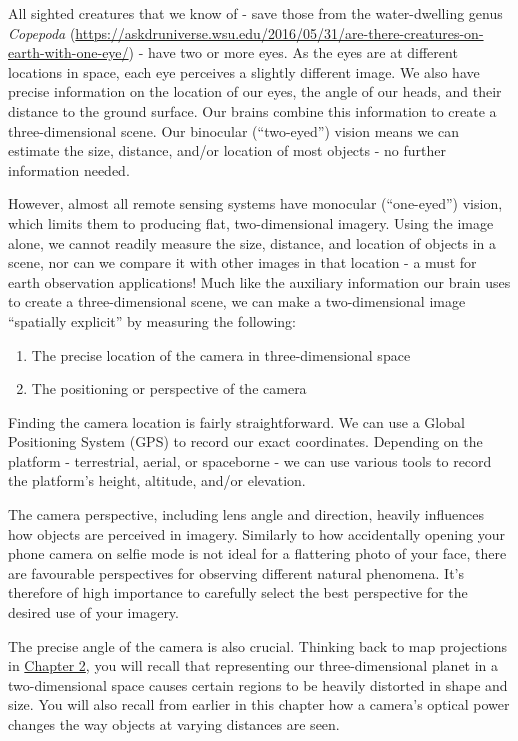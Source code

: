 \documentclass[
]{book}
\providecommand{\tightlist}{%
  \setlength{\itemsep}{0pt}\setlength{\parskip}{0pt}}
\begin{document}
All sighted creatures that we know of - save those from the water-dwelling genus \emph{Copepoda} (\url{https://askdruniverse.wsu.edu/2016/05/31/are-there-creatures-on-earth-with-one-eye/}) - have two or more eyes. As the eyes are at different locations in space, each eye perceives a slightly different image. We also have precise information on the location of our eyes, the angle of our heads, and their distance to the ground surface. Our brains combine this information to create a three-dimensional scene. Our binocular (``two-eyed'') vision means we can estimate the size, distance, and/or location of most objects - no further information needed.

However, almost all remote sensing systems have monocular (``one-eyed'') vision, which limits them to producing flat, two-dimensional imagery. Using the image alone, we cannot readily measure the size, distance, and location of objects in a scene, nor can we compare it with other images in that location - a must for earth observation applications! Much like the auxiliary information our brain uses to create a three-dimensional scene, we can make a two-dimensional image ``spatially explicit'' by measuring the following:

\begin{enumerate}
\def\labelenumi{\arabic{enumi}.}
\tightlist
\item
  The precise location of the camera in three-dimensional space
\item
  The positioning or perspective of the camera
\end{enumerate}

Finding the camera location is fairly straightforward. We can use a Global Positioning System (GPS) to record our exact coordinates. Depending on the platform - terrestrial, aerial, or spaceborne - we can use various tools to record the platform's height, altitude, and/or elevation.

The camera perspective, including lens angle and direction, heavily influences how objects are perceived in imagery. Similarly to how accidentally opening your phone camera on selfie mode is not ideal for a flattering photo of your face, there are favourable perspectives for observing different natural phenomena. It's therefore of high importance to carefully select the best perspective for the desired use of your imagery.

The precise angle of the camera is also crucial. Thinking back to map projections in \href{https://ubc-geomatics-textbook.github.io/geomatics-textbook/mapping-data.html}{Chapter 2}, you will recall that representing our three-dimensional planet in a two-dimensional space causes certain regions to be heavily distorted in shape and size. You will also recall from earlier in this chapter how a camera's optical power changes the way objects at varying distances are seen.
\end{document}
